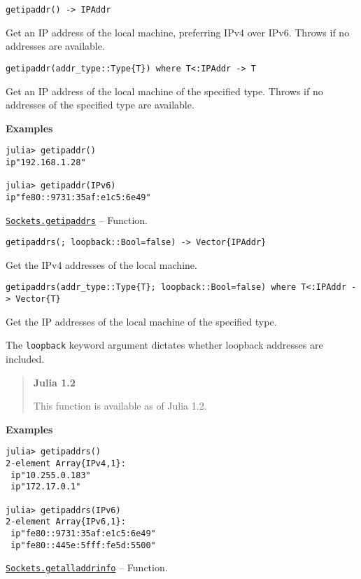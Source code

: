 \begin{adjustwidth}{2em}{0pt}


\begin{verbatim}
getipaddr() -> IPAddr
\end{verbatim}

Get an IP address of the local machine, preferring IPv4 over IPv6. Throws if no addresses are available.


\begin{lstlisting}
getipaddr(addr_type::Type{T}) where T<:IPAddr -> T
\end{lstlisting}

Get an IP address of the local machine of the specified type. Throws if no addresses of the specified type are available.

\textbf{Examples}


\begin{verbatim}
julia> getipaddr()
ip"192.168.1.28"

julia> getipaddr(IPv6)
ip"fe80::9731:35af:e1c5:6e49"
\end{verbatim}



\end{adjustwidth}
\hypertarget{11225054155479915290}{} 
\hyperlink{11225054155479915290}{\texttt{Sockets.getipaddrs}}  -- {Function.}

\begin{adjustwidth}{2em}{0pt}


\begin{verbatim}
getipaddrs(; loopback::Bool=false) -> Vector{IPAddr}
\end{verbatim}

Get the IPv4 addresses of the local machine.


\begin{lstlisting}
getipaddrs(addr_type::Type{T}; loopback::Bool=false) where T<:IPAddr -> Vector{T}
\end{lstlisting}

Get the IP addresses of the local machine of the specified type.

The \texttt{loopback} keyword argument dictates whether loopback addresses are included.

\begin{quote}
\textbf{Julia 1.2}

This function is available as of Julia 1.2.

\end{quote}
\textbf{Examples}


\begin{verbatim}
julia> getipaddrs()
2-element Array{IPv4,1}:
 ip"10.255.0.183"
 ip"172.17.0.1"

julia> getipaddrs(IPv6)
2-element Array{IPv6,1}:
 ip"fe80::9731:35af:e1c5:6e49"
 ip"fe80::445e:5fff:fe5d:5500"
\end{verbatim}



\end{adjustwidth}
\hypertarget{14820421424669368163}{} 
\hyperlink{14820421424669368163}{\texttt{Sockets.getalladdrinfo}}  -- {Function.}


